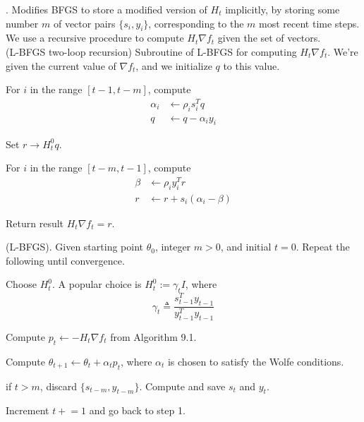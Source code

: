 \documentclass[11pt]{article}
\begin{document}
\myspace{}
\p {}. Modifies BFGS to store a modified version of $H_t$ implicitly, by storing some number $m$ of vector pairs $\{s_i, y_i\}$, corresponding to the $m$ most recent time steps. We use a recursive procedure to compute $H_t \nabla f_t$ given the set of vectors. \\

 (L-BFGS two-loop recursion) Subroutine of L-BFGS for computing $ H_t \nabla f_t$. We're given the current value of $\nabla f_t$, and we initialize $q$ to this value. 
\begin{compactenum}
	\item For $i$ in the range $[t - 1, t - m]$, compute
	\begin{align}
		\alpha_i &\leftarrow \rho_i s_i^T q \\
		q &\leftarrow q - \alpha_i y_i
	\end{align}
	
	\item Set $r \rightarrow H_t^0 q$. 
	
	\item For $i$ in the range $[t - m, t - 1]$, compute
	\begin{align}
		\beta &\leftarrow \rho_i y_i^T r \\
		r &\leftarrow r + s_i(\alpha_i - \beta)
	\end{align}
	
	\item Return result $H_t \nabla f_t = r$. 
\end{compactenum}

 (L-BFGS). Given starting point $\theta_0$, integer $m > 0$, and initial $t = 0$. Repeat the following until convergence.
\begin{compactenum}
	\item Choose $H_t^0$. A popular choice is $H_t^0 := \gamma_t I$, where 
	$$
	\gamma_t \triangleq \frac{ s_{t - 1}^T y_{t - 1}  }{ y_{t - 1}^T y_{t - 1}  }
	$$
	
	\item Compute $p_t \leftarrow - H_t \nabla f_t$ from Algorithm 9.1. 
	
	\item Compute $\theta_{t + 1} \leftarrow \theta_t + \alpha_t p_t$, where $\alpha_t$ is chosen to satisfy the Wolfe conditions. 
	
	\item if $t > m$, discard $\{s_{t - m}, y_{t - m}  \}$. Compute and save $s_t$ and $y_t$. 
	
	\item Increment $t \mathrel{+}=  1$ and go back to step 1. 
\end{compactenum}
\end{document}
